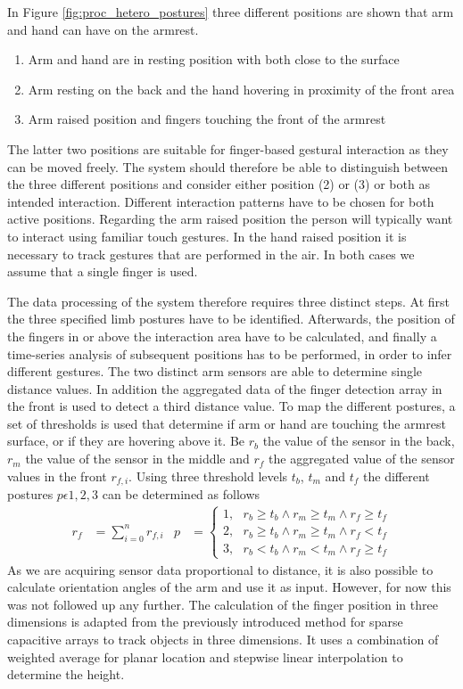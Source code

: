 In Figure \ref{fig:proc_hetero_postures} three different positions are shown that arm and hand can have on the armrest. 
\begin{enumerate}
\item Arm and hand are in resting position with both close to the surface
\item Arm resting on the back and the hand hovering in proximity of the front area
\item Arm raised position and fingers touching the front of the armrest
\end{enumerate}
The latter two positions are suitable for finger-based gestural interaction as they can be moved freely. The system should therefore be able to distinguish between the three different positions and consider either position (2) or (3) or both as intended interaction. Different interaction patterns have to be chosen for both active positions. Regarding the arm raised position the person will typically want to interact using familiar touch gestures. In the hand raised position it is necessary to track gestures that are performed in the air. In both cases we assume that a single finger is used.  
 
The data processing of the system therefore requires three distinct steps. At first the three specified limb postures have to be identified. Afterwards, the position of the fingers in or above the interaction area have to be calculated, and finally a time-series analysis of subsequent positions has to be performed, in order to infer different gestures. The two distinct arm sensors are able to determine single distance values. In addition the aggregated data of the finger detection array in the front is used to detect a third distance value. To map the different postures, a set of thresholds is used that determine if arm or hand are touching the armrest surface, or if they are hovering above it. Be $r_b$ the value of the sensor in the back, $r_m$ the value of the sensor in the middle and $r_f$ the aggregated value of the sensor values in the front $r_{f,i}$. Using three threshold levels $t_b$, $t_m$ and $t_f$ the different postures $p\epsilon{1,2,3}$ can be determined as follows
\begin{align}
r_f&=\sum^n_{i=0}{r_{f,i}} & p&=\left\{ \begin{array}{c}
1,\ \ \ r_b\ge t_b \wedge r_m\ge t_m \wedge r_f\ge t_f\\ 
2,\ \ \ r_b\ge t_b \wedge r_m\ge t_m \wedge r_f< t_f \\ 
3,\ \ \ r_b< t_b \wedge r_m< t_m \wedge r_f\ge t_f \end{array}
\right.
\end{align}
As we are acquiring sensor data proportional to distance, it is also possible to calculate orientation angles of the arm and use it as input. However, for now this was not followed up any further. The calculation of the finger position in three dimensions is adapted from the previously introduced method for sparse capacitive arrays to track objects in three dimensions. It uses a combination of weighted average for planar location and stepwise linear interpolation to determine the height. 

